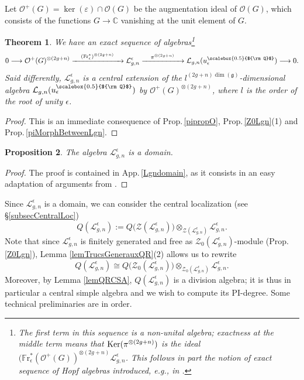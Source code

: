 \documentclass[11pt]{amsart}
\newtheorem{teo}{Theorem}[section]
\newtheorem{prop}[teo]{Proposition}
\newcommand{\e}{\epsilon}
\newcommand{\Ll}{\mathcal{L}}
\newcommand{\Oo}{\mathcal{O}}
\newcommand{\Q}{{\scalebox{0.5}{${\rm Q}$}}}
\begin{document}
Let $\Oo^+(G) = \ker(\varepsilon) \cap \Oo(G)$ be the augmentation ideal of $\mathcal{O}(G)$, which consists of the functions $G \to \mathbb{C}$ vanishing at the unit element of $G$. 
\begin{teo}\label{centralextLgn} We have an exact sequence of algebras\footnote{The first term in this sequence is a non-unital algebra; exactness at the middle term means that ${\rm Ker}(\pi^{\otimes (2g+n)})$ is the ideal $(\mathbb{F}\mathrm{r}_\e^{*}(\Oo^+(G))^{\otimes (2g+n)}\mathcal{L}_{g,n}^{\e}$. This follows in part the notion of exact sequence of Hopf algebras introduced, e.g., in \cite{AD}.}
\begin{equation}\label{exactsequenceue}
0 \longrightarrow \Oo^+(G)^{\otimes (2g+n)} \xrightarrow{\quad(\mathbb{F}\mathrm{r}_\e^{*})^{\otimes (2g+n)}\quad} \mathcal{L}_{g,n}^{\e} \xrightarrow{\quad \pi^{\otimes (2g+n)} \quad} \mathcal{L}_{g,n}(u_\epsilon^\Q) \longrightarrow 0.
\end{equation}
Said differently, $\mathcal{L}_{g,n}^{\epsilon}$ is a central extension of the $l^{(2g+n)\dim(\mathfrak{g})}$-dimensional algebra $\mathcal{L}_{g,n}(u_\epsilon^\Q)$ by $\Oo^+(G)^{\otimes (2g+n)}$, where $l$ is the order of the root of unity $\e$.
\end{teo}
\begin{proof}
This is an immediate consequence of Prop.\,\ref{pipropO}, Prop.\,\ref{Z0Lgn}(1) and Prop.\,\ref{piMorphBetweenLgn}.
\end{proof}

\begin{prop}\label{propLgndomain}
The algebra $\mathcal{L}_{g,n}^{\e}$ is a domain. 
\end{prop}
\begin{proof}
The proof is contained in App.\,\ref{Lgndomain}, as it consists in an easy adaptation of arguments from \cite{BFR}. \end{proof}
\noindent Since $\mathcal{L}_{g,n}^{\e}$ is a domain, we can consider the central localization (see \S\ref{subsecCentralLoc})
\begin{equation}\label{QLe}
Q(\Ll_{g,n}^\e) := Q\bigl( \mathcal{Z}(\Ll_{g,n}^\e) \bigr)  \otimes_{\mathcal{Z}(\Ll_{g,n}^\e)} \Ll_{g,n}^\e.
\end{equation}
Note that since $\mathcal{L}_{g,n}^\e$ is finitely generated and free as $\mathcal{Z}_0(\mathcal{L}_{g,n}^\e)$-module (Prop.\,\ref{Z0Lgn}), Lemma \ref{lemTrucsGenerauxQR}(2) allows us to rewrite
\[ Q(\Ll_{g,n}^\e) \cong Q\bigl( \mathcal{Z}_0(\Ll_{g,n}^\e) \bigr)  \otimes_{\mathcal{Z}_0(\Ll_{g,n}^\e)} \Ll_{g,n}^\e. \]
Moreover, by Lemma \ref{lemQRCSA}, $Q(\Ll_{g,n}^\e)$ is a division algebra; it is thus in particular a central simple algebra and we wish to compute its PI-degree. Some technical preliminaries are in order.
\end{document}
